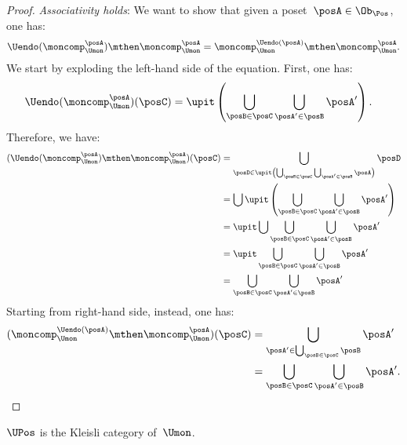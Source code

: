 \begin{proof}
  \emph{Associativity holds}: We want to show that given a poset~$\posA\in \Ob_\Pos$, one has:
  \begin{equation}
    \Uendo(\moncomp_{\Umon}^{\posA})\mthen \moncomp_{\Umon}^{\posA}= \moncomp_{\Umon}^{\Uendo(\posA)}\mthen \moncomp_{\Umon}^{\posA}.
  \end{equation}
  We start by exploding the left-hand side of the equation. First, one has:
  \begin{equation*}
    \begin{aligned}
      \Uendo(\moncomp_{\Umon}^{\posA})(\posC)&=\upit \left( \bigcup_{\posB\in \posC}\bigcup_{\posA'\in \posB} \posA'\right).
    \end{aligned}
  \end{equation*}
  Therefore, we have:
  \begin{equation*}
    \begin{aligned}
      (\Uendo(\moncomp_{\Umon}^{\posA})\mthen \moncomp_{\Umon}^{\posA})(\posC)&=\bigcup_{\posD \in \upit \left( \bigcup_{\posB\in \posC}\bigcup_{\posA'\in \posB} \posA\right)} \posD\\
      &=\bigcup \upit \left( \bigcup_{\posB\in \posC}\bigcup_{\posA'\in \posB} \posA'\right)\\
      &=\upit \bigcup \bigcup_{\posB\in \posC}\bigcup_{\posA'\in \posB} \posA'\\
      &=\upit  \bigcup_{\posB\in \posC}\bigcup_{\posA'\in \posB} \posA'\\
      &= \bigcup_{\posB\in \posC}\bigcup_{\posA'\in \posB} \posA'
    \end{aligned}
  \end{equation*}
  Starting from right-hand side, instead, one has:
  \begin{equation*}
    \begin{aligned}
      (\moncomp_{\Umon}^{\Uendo(\posA)}\mthen \moncomp_{\Umon}^{\posA})(\posC)&=\bigcup_{\posA'\in \bigcup_{\posB\in \posC}\posB}\posA'\\
      &=\bigcup_{\posB\in \posC}\bigcup_{\posA'\in \posB} \posA'.
    \end{aligned}
  \end{equation*}
\end{proof}

\begin{lemma}
\label{lem:uposkleisli}
  $\UPos$ is the Kleisli category of~$\Umon$.
\end{lemma}